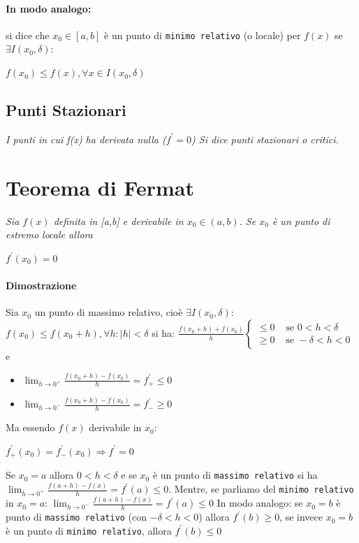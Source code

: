 \paragraph{In modo analogo:}
si dice che $x_0\in[a, b]$ è un punto di \texttt{minimo relativo} (o locale)
per $f(x)$ se $\exists I (x_0,\delta)$:
\begin{center}
	$f(x_0)\leq f(x),\forall x \in I (x_0,\delta)$
\end{center}
\subsection{Punti Stazionari}
\textit{I punti in cui f(x) ha derivata nulla ($f^\prime=0$) Si dice punti
stazionari o critici.}
\section{Teorema di Fermat}
\textit{Sia $f(x)$ definita in [a,b] e derivabile in $x_0\in(a, b)$. Se $x_0$ è
un punto di estremo locale allora}
\begin{center}
	$f^\prime (x_0)=0$
\end{center}
\paragraph{Dimostrazione} Sia $x_0$ un punto di massimo relativo, cioè $\exists
I (x_0,\delta)$: $f(x_0)\leq f(x_0+h), \forall h: |h|<\delta$ si ha:
$\frac{f(x_0+h)+f(x_0)}{h}\begin{cases}
	\leq 0 & \text{ se } 0<h<\delta\\
	\geq 0 & \text{ se } -\delta<h<0 
\end{cases}$ e 
\begin{itemize}
	\item $\lim_{h\to 0^+}\frac{f(x_0+h)-f(x_0)}{h}=f^\prime_+\leq 0$
	\item $\lim_{h\to 0^-}\frac{f(x_0+h)-f(x_0)}{h}=f^\prime_-\geq 0$
\end{itemize}
Ma essendo $f(x)$ derivabile in $x_0$:
\begin{center}
	$f^\prime_+(x_0)=f^\prime_-(x_0)\Rightarrow f^\prime=0$
\end{center}
Se $x_0=a$ allora $0<h<\delta$ e se $x_0$ è un punto di \texttt{massimo 
relativo} si ha $\lim_{h\to 0^+}\frac{f(a+h)-f(x)}{h}=f^\prime(a)\leq 0$.
Mentre, se parliamo del \texttt{minimo relativo} in $x_0=a$: 
$\lim_{h\to 0^-}\frac{f(a+h)-f(x)}{h}=f^\prime(a)\leq 0$ In modo analogo: se
$x_0=b$ è punto di \texttt{massimo relativo} (con $-\delta<h<0$) allora
$f^\prime(b)\geq 0$, se invece $x_0=b$ è un punto di \texttt{minimo relativo},
allora $f^\prime(b)\leq 0$
